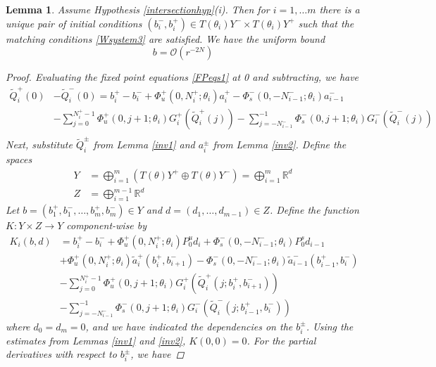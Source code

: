 \documentclass[12pt]{article}
\def\R{{\mathbb R}}
\newtheorem{lemma}{Lemma}
\begin{document}
\begin{lemma}\label{inv3t}
Assume Hypothesis \ref{intersectionhyp}(i). Then for $i = 1, \dots m$ there is a unique pair of initial conditions $(b_i^-, b_i^+) \in T(\theta_i) Y^- \times T(\theta_i) Y^+$ such that the matching conditions \eqref{Wsystem3} are satisfied. We have the uniform bound
\begin{equation}\label{bboundt}
b = \mathcal{O}(r^{-2N})
\end{equation}

\begin{proof}
Evaluating the fixed point equations \eqref{FPeqs1} at 0 and subtracting, we have
\begin{align*}
\tilde{Q}_i^+(0) &- \tilde{Q}_i^-(0) = b_i^+ - b_i^- 
+ \Phi_u^+(0, N_i^+; \theta_i) a_i^+ - \Phi_s^-(0, -N_{i-1}^-; \theta_i) a_{i-1}^- \\
&- \sum_{j = 0}^{N_i^+-1} \Phi_u^+(0, j+1; \theta_i) G_i^+(\tilde{Q}_i^+(j)) 
- \sum_{j = -N_{i-1}^-}^{-1} \Phi_s^-(0, j+1; \theta_i) G_i^-(\tilde{Q}_i^-(j)) \\
\end{align*}
Next, substitute $\tilde{Q}_i^\pm$ from Lemma \ref{inv1} and $a_i^\pm$ from Lemma \ref{inv2}. Define the spaces
\begin{align}\label{spaceYt}
Y &= \bigoplus_{i=1}^m (T(\theta) Y^+ \oplus T(\theta) Y^-) = \bigoplus_{i=1}^m \R^d \\
Z &= \bigoplus_{i=1}^{m-1} \R^d
\end{align}
Let $b = (b_1^+, b_1^-, \dots, b_m^+, b_m^-) \in Y$ and $d = (d_1, \dots, d_{m-1}) \in Z$. Define the function $K: Y \times Z \rightarrow Y$ component-wise by
\begin{align*}
K_i(b, d) &= 
 b_i^+ - b_i^- + \Phi_u^+(0, N_i^+; \theta_i) P_0^u d_i + \Phi_s^-(0, -N_{i-1}^-; \theta_i) P_0^s d_{i-1} \\
&+ \Phi_u^+(0, N_i^+; \theta_i) \tilde{a}_i^+(b_i^+, b_{i+1}^-) 
- \Phi_s^-(0, -N_{i-1}^-; \theta_i) \tilde{a}_{i-1}^-(b_{i-1}^+, b_i^-) \\
&- \sum_{j = 0}^{N_i^+-1} \Phi_u^+(0, j+1; \theta_i) G_i^+(\tilde{Q}_i^+(j; b_i^+, b_{i+1}^-)) \\
&- \sum_{j = -N_{i-1}^-}^{-1} \Phi_s^-(0, j+1; \theta_i) G_i^-(\tilde{Q}_i^-(j; b_{i-1}^+, b_i^-))
\end{align*}
where $d_0 = d_m = 0$, and we have indicated the dependencies on the $b_i^\pm$. Using the estimates from Lemmas \ref{inv1} and \ref{inv2}, $K(0, 0) = 0$. For the partial derivatives with respect to $b_i^\pm$, we have

\end{proof}
\end{lemma}
\end{document}

